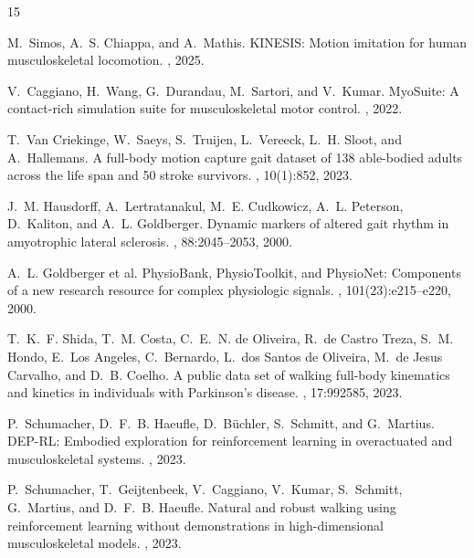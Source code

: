 \documentclass{article}
\begin{document}

\begin{thebibliography}{15}

M.~Simos, A.~S. Chiappa, and A.~Mathis.
\newblock KINESIS: Motion imitation for human musculoskeletal locomotion.
, 2025.

V.~Caggiano, H.~Wang, G.~Durandau, M.~Sartori, and V.~Kumar.
\newblock MyoSuite: A contact-rich simulation suite for musculoskeletal motor control.
, 2022.

T.~Van Criekinge, W.~Saeys, S.~Truijen, L.~Vereeck, L.~H. Sloot, and A.~Hallemans.
\newblock A full-body motion capture gait dataset of 138 able-bodied adults across the life span and 50 stroke survivors.
, 10(1):852, 2023.

J.~M. Hausdorff, A.~Lertratanakul, M.~E. Cudkowicz, A.~L. Peterson, D.~Kaliton, and A.~L. Goldberger.
\newblock Dynamic markers of altered gait rhythm in amyotrophic lateral sclerosis.
, 88:2045--2053, 2000.

A.~L. Goldberger et al.
\newblock PhysioBank, PhysioToolkit, and PhysioNet: Components of a new research resource for complex physiologic signals.
, 101(23):e215--e220, 2000.

T.~K.~F. Shida, T.~M. Costa, C.~E.~N. de Oliveira, R.~de Castro Treza, S.~M. Hondo, E.~Los Angeles, C.~Bernardo, L.~dos Santos de Oliveira, M.~de Jesus Carvalho, and D.~B. Coelho.
\newblock A public data set of walking full-body kinematics and kinetics in individuals with Parkinson's disease.
, 17:992585, 2023.

P.~Schumacher, D.~F.~B. Haeufle, D.~B\"uchler, S.~Schmitt, and G.~Martius.
\newblock DEP-RL: Embodied exploration for reinforcement learning in overactuated and musculoskeletal systems.
, 2023.

P.~Schumacher, T.~Geijtenbeek, V.~Caggiano, V.~Kumar, S.~Schmitt, G.~Martius, and D.~F.~B. Haeufle.
\newblock Natural and robust walking using reinforcement learning without demonstrations in high-dimensional musculoskeletal models.
, 2023.


\end{thebibliography}
\end{document}
